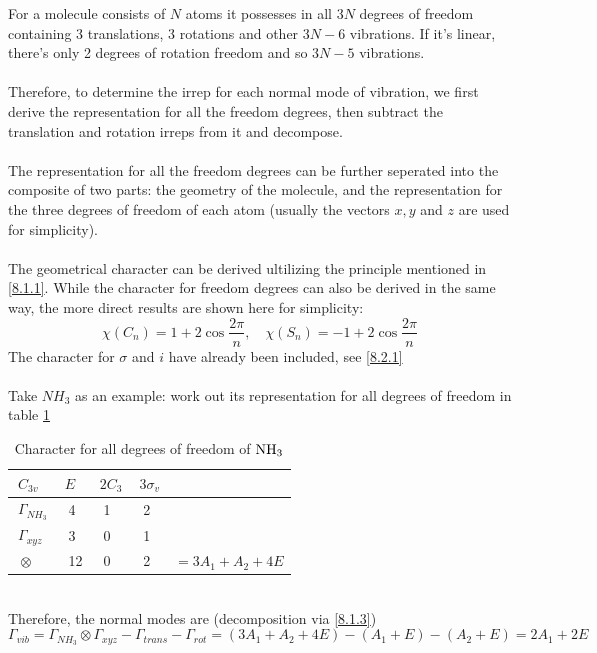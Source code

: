 		For a molecule consists of $N$ atoms it possesses in all $3N$ degrees of freedom containing 
		3 translations, 3 rotations and other $3N-6$ vibrations.
		If it's linear, there's only 2 degrees of rotation freedom and so $3N-5$ vibrations.\\\ \\
		Therefore, to determine the irrep for each normal mode of vibration, 
		we first derive the representation for all the freedom degrees, then subtract the translation and rotation irreps from it and decompose.\\\ \\
		The representation for all the freedom degrees can be further seperated into the composite of two parts: 
		the geometry of the molecule, and the representation for the three degrees of freedom of each atom
		(usually the vectors $x, y$ and $z$ are used for simplicity).\\\ \\
		The geometrical character can be derived ultilizing the principle mentioned in \ref{8.1.1}.
		While the character for freedom degrees can also be derived in the same way, the more direct results are shown here for simplicity:
		\[\chi(C_n) = 1+2\cos\frac{2\pi}{n}, \quad \chi(S_n) = -1+2\cos\frac{2\pi}{n}\]
		The character for $\sigma$ and $i$ have already been included, see \ref{8.2.1}\\\ \\
		Take $NH_3$ as an example: work out its representation for all degrees of freedom in table \ref{freed}\\
		\begin{table}
		\centering
		\begin{tabular}{p{7em}|p{7em}p{7em}p{6em}p{8em}}
			\toprule
			$\ C_{3v}$ & $\ E$ & $\ 2C_3$ & $\ 3\sigma_v$ \\
			\midrule
			$\ \Gamma_{NH_3}$ & \ 4 & \ 1 & \ 2 \\
			$\ \Gamma_{xyz}$ & \ 3 & \ 0 & \ 1 \\
			\midrule
			$\ \otimes$ & \ 12 & \ 0 & \ 2 & $=3A_1+A_2+4E$\\
			\bottomrule
		
		\end{tabular}
		\caption{Character for all degrees of freedom of $\rm NH_3$}
		\label{freed}
		\end{table} \\
		
		\!\!\!\!\!\!\!\!Therefore, the normal modes are (decomposition via \ref{8.1.3})
		\[\Gamma_{vib} = \Gamma_{NH_3} \otimes \Gamma_{xyz} - \Gamma_{trans} - \Gamma_{rot} = (3A_1+A_2+4E) - (A_1+E) - (A_2+E) = 2A_1+2E\]
		
